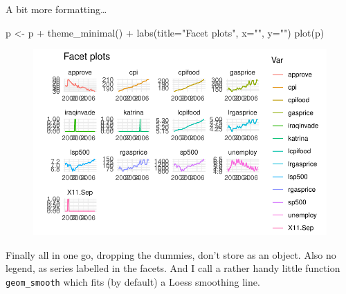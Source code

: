 \documentclass[
  letterpaper,
]{book}
\newenvironment{Shaded}{\begin{snugshade}}{\end{snugshade}}
\newcommand{\AttributeTok}[1]{\textcolor[rgb]{0.40,0.45,0.13}{#1}}
\newcommand{\FunctionTok}[1]{\textcolor[rgb]{0.28,0.35,0.67}{#1}}
\newcommand{\NormalTok}[1]{\textcolor[rgb]{0.00,0.23,0.31}{#1}}
\newcommand{\OtherTok}[1]{\textcolor[rgb]{0.00,0.23,0.31}{#1}}
\newcommand{\SpecialCharTok}[1]{\textcolor[rgb]{0.37,0.37,0.37}{#1}}
\newcommand{\StringTok}[1]{\textcolor[rgb]{0.13,0.47,0.30}{#1}}
\begin{document}
A bit more formatting\ldots{}

\begin{Shaded}
\begin{Highlighting}[]
\NormalTok{p  }\OtherTok{\textless{}{-}}\NormalTok{ p }\SpecialCharTok{+}
  \FunctionTok{theme\_minimal}\NormalTok{() }\SpecialCharTok{+} 
  \FunctionTok{labs}\NormalTok{(}\AttributeTok{title=}\StringTok{"Facet plots"}\NormalTok{, }\AttributeTok{x=}\StringTok{""}\NormalTok{, }\AttributeTok{y=}\StringTok{""}\NormalTok{)}
\FunctionTok{plot}\NormalTok{(p)}
\end{Highlighting}
\end{Shaded}

\begin{figure}[H]

{\centering \includegraphics{Appendix1_files/figure-pdf/unnamed-chunk-11-1.pdf}

}

\end{figure}

Finally all in one go, dropping the dummies, don't store as an object.
Also no legend, as series labelled in the facets. And I call a rather
handy little function \texttt{geom\_smooth} which fits (by default) a
Loess smoothing line.
\end{document}
